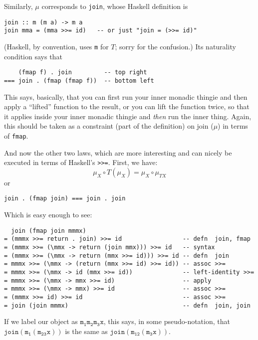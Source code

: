 \documentclass[10pt,letterpaper]{article}
\begin{document}
Similarly, $\mu$ corresponds to \texttt{join}, whose Haskell definition
is
\begin{lstlisting}
join :: m (m a) -> m a
join mma = (mma >>= id)   -- or just "join = (>>= id)"
\end{lstlisting}
(Haskell, by convention, uses \texttt{m} for $T$; sorry for the confusion.)
Its naturality condition says that
\begin{lstlisting}
    (fmap f) . join         -- top right
=== join . (fmap (fmap f))  -- bottom left
\end{lstlisting}
This says, basically, that you can first run your inner monadic thingie and
then apply a ``lifted'' function to the result, or you can lift the function
twice, so that it applies inside your inner monadic thingie and {\em then}
run the inner thing.  Again, this should be taken as a constraint (part of
the definition) on join ($\mu$) in terms of \texttt{fmap}.

And now the other two laws, which are more interesting and can nicely be
executed in terms of Haskell's \verb|>>=|.  First, we have:
\[ \mu_X \circ T(\mu_X) = \mu_X \circ \mu_{TX} \]
or
\begin{lstlisting}
join . (fmap join) === join . join
\end{lstlisting}
Which is easy enough to see:
\begin{lstlisting}
  join (fmap join mmmx)
= (mmmx >>= return . join) >>= id                 -- defn  join, fmap
= (mmmx >>= (\mmx -> return (join mmx))) >>= id   -- syntax
= (mmmx >>= (\mmx -> return (mmx >>= id))) >>= id -- defn  join
= mmmx >>= (\mmx -> (return (mmx >>= id) >>= id)) -- assoc >>=
= mmmx >>= (\mmx -> id (mmx >>= id))              -- left-identity >>=
= mmmx >>= (\mmx -> mmx >>= id)                   -- apply
= mmmx >>= (\mmx -> mmx) >>= id                   -- assoc >>=
= (mmmx >>= id) >>= id                            -- assoc >>=
= join (join mmmx)                                -- defn  join, join
\end{lstlisting}
If we label our  object as $\mathtt{m_1 m_2 m_3 x}$, this
says, in some pseudo-notation, that $\mathtt{join (m_1 (m_{23} x))}$
is the same as $\mathtt{join (m_{12} (m_3 x))}$.
\end{document}
